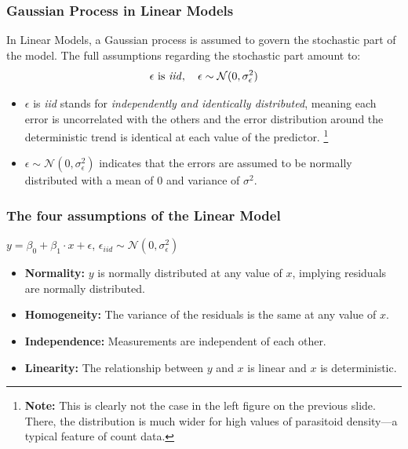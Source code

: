 \documentclass{beamer}
\begin{document}
\begin{frame}
    \frametitle{Gaussian Process in Linear Models}
    In Linear Models, a Gaussian process is assumed to govern the stochastic part of the model. The full assumptions regarding the stochastic part amount to:
    \begin{equation*}
        \epsilon \text{ is \textit{iid}}, \quad \epsilon \sim \mathcal{N}(0, \sigma^2_{\epsilon})
    \end{equation*}
    \pause 
    \begin{itemize}
        \item $\epsilon$ is \textit{iid} stands for \textit{independently and identically distributed}, meaning each error is uncorrelated with the others and the error distribution around the deterministic trend is identical at each value of the predictor. \footnote{\textbf{Note:} This is clearly not the case in the left figure on the previous slide. There, the distribution is much wider for high values of parasitoid density—a typical feature of count data.} 
        \item $\epsilon \sim \mathcal{N}(0, \sigma^2_{\epsilon})$ indicates that the errors are assumed to be normally distributed with a mean of 0 and variance of $\sigma^2$. 
    \end{itemize}
\end{frame}

\begin{frame}
    \frametitle{The four assumptions of the Linear Model}
    $y = \beta_0 + \beta_1 \cdot x + \epsilon$, $\epsilon_{iid} \sim \mathcal{N}(0, \sigma^2_{\epsilon})$ \\
    \vspace{0.5cm}
    \pause
    
    \begin{itemize}
        \item \textbf{Normality:} $y$ is normally distributed at any value of $x$, implying residuals are normally distributed.
        \item \textbf{Homogeneity:} The variance of the residuals is the same at any value of $x$.
        \item \textbf{Independence:} Measurements are independent of each other.
        \item \textbf{Linearity:} The relationship between $y$ and $x$ is linear and $x$ is deterministic.
    \end{itemize}
    
\end{frame}
\end{document}
